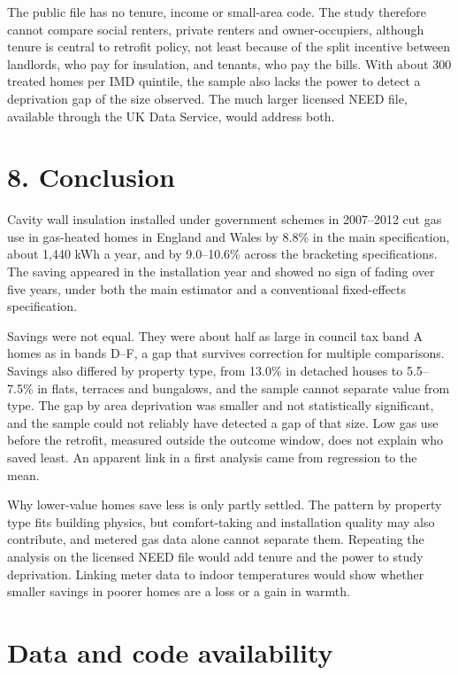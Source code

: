 \documentclass[11pt,a4paper]{article}
\begin{document}
The public file has no tenure, income or small-area code. The study therefore cannot compare social renters, private renters and owner-occupiers, although tenure is central to retrofit policy, not least because of the split incentive between landlords, who pay for insulation, and tenants, who pay the bills. With about 300 treated homes per IMD quintile, the sample also lacks the power to detect a deprivation gap of the size observed. The much larger licensed NEED file, available through the UK Data Service, would address both.

\section*{8. Conclusion}

Cavity wall insulation installed under government schemes in 2007--2012 cut gas use in gas-heated homes in England and Wales by 8.8\% in the main specification, about 1,440 kWh a year, and by 9.0--10.6\% across the bracketing specifications. The saving appeared in the installation year and showed no sign of fading over five years, under both the main estimator and a conventional fixed-effects specification.

Savings were not equal. They were about half as large in council tax band A homes as in bands D--F, a gap that survives correction for multiple comparisons. Savings also differed by property type, from 13.0\% in detached houses to 5.5--7.5\% in flats, terraces and bungalows, and the sample cannot separate value from type. The gap by area deprivation was smaller and not statistically significant, and the sample could not reliably have detected a gap of that size. Low gas use before the retrofit, measured outside the outcome window, does not explain who saved least. An apparent link in a first analysis came from regression to the mean.

Why lower-value homes save less is only partly settled. The pattern by property type fits building physics, but comfort-taking and installation quality may also contribute, and metered gas data alone cannot separate them. Repeating the analysis on the licensed NEED file would add tenure and the power to study deprivation. Linking meter data to indoor temperatures would show whether smaller savings in poorer homes are a loss or a gain in warmth.

\section*{Data and code availability}
\end{document}
